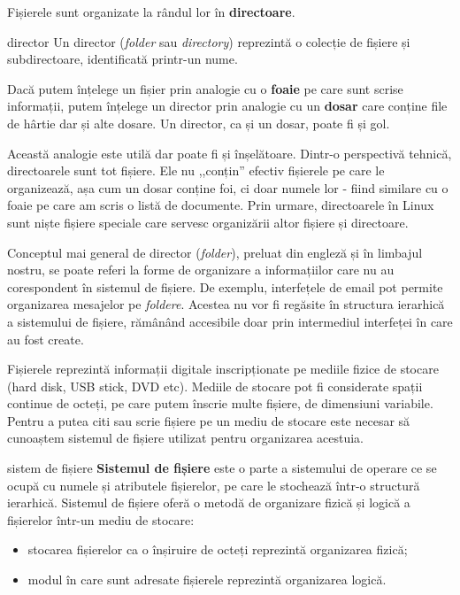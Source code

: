 Fișierele sunt organizate la rândul lor în \textbf{directoare}.

\begin{definition}{director}
Un director (\textit{folder} sau \textit{directory}) reprezintă o colecție de fișiere și subdirectoare, identificată printr-un nume.
\end{definition}

Dacă putem înțelege un fișier prin analogie cu o \textbf{foaie} pe care sunt scrise informații, putem înțelege un director prin analogie cu un \textbf{dosar} care conține file de hârtie dar și alte dosare. Un director, ca și un dosar, poate fi și gol.

Această analogie este utilă dar poate fi și înșelătoare. Dintr-o perspectivă tehnică, directoarele sunt tot fișiere. Ele nu ,,conțin'' efectiv fișierele pe care le organizează, așa cum un dosar conține foi, ci doar numele lor - fiind similare cu o foaie pe care am scris o listă de documente. Prin urmare, directoarele în Linux sunt niște fișiere speciale care servesc
organizării altor fișiere și directoare.

\begin{note}
Conceptul mai general de director (\textit{folder}), preluat din engleză și în limbajul nostru, se poate referi la forme de organizare a informațiilor care nu au corespondent în sistemul de fișiere. De exemplu, interfețele de email pot permite organizarea mesajelor pe \textit{foldere}. Acestea nu vor fi regăsite în structura ierarhică a sistemului de fișiere, rămânând accesibile doar prin intermediul interfeței în care au fost create.
\end{note}

Fișierele reprezintă informații digitale inscripționate pe mediile fizice de stocare (hard disk, USB stick, DVD etc). Mediile de stocare pot fi considerate spații continue de octeți, pe care putem înscrie multe fișiere, de dimensiuni variabile. Pentru a putea citi sau scrie fișiere pe un mediu de stocare este necesar să cunoaștem sistemul de fișiere utilizat pentru organizarea acestuia.

\begin{definition}{sistem de fișiere}
\textbf{Sistemul de fișiere} este o parte a sistemului de operare ce se ocupă cu numele și atributele fișierelor, pe care le stochează într-o structură ierarhică. Sistemul de fișiere oferă o metodă de organizare fizică și logică a fișierelor într-un mediu de stocare:

\begin{itemize}
  \item stocarea fișierelor ca o înșiruire de octeți reprezintă organizarea fizică;
  \item modul în care sunt adresate fișierele reprezintă organizarea logică.
\end{itemize}
\end{definition}

